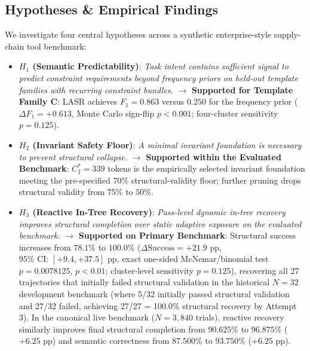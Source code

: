 \subsection{Hypotheses \& Empirical Findings}
We investigate four central hypotheses across a synthetic enterprise-style supply-chain tool benchmark:
\begin{itemize}
    \item \textbf{$H_1$ (Semantic Predictability)}: \textit{Task intent contains sufficient signal to predict constraint requirements beyond frequency priors on held-out template families with recurring constraint bundles.} $\rightarrow$ \textbf{Supported for Template Family C}: LASR achieves $F_1 = 0.863$ versus $0.250$ for the frequency prior ($\Delta F_1 = +0.613$, Monte Carlo sign-flip $p < 0.001$; four-cluster sensitivity $p = 0.125$).
    \item \textbf{$H_2$ (Invariant Safety Floor)}: \textit{A minimal invariant foundation is necessary to prevent structural collapse.} $\rightarrow$ \textbf{Supported within the Evaluated Benchmark}: $C_I^* = 339$ tokens is the empirically selected invariant foundation meeting the pre-specified 70\% structural-validity floor; further pruning drops structural validity from $75\%$ to $50\%$.
    \item \textbf{$H_3$ (Reactive In-Tree Recovery)}: \textit{Pass-level dynamic in-tree recovery improves structural completion over static adaptive exposure on the evaluated benchmark.} $\rightarrow$ \textbf{Supported on Primary Benchmark}: Structural success increases from $78.1\%$ to $100.0\%$ ($\Delta\text{Success} = +21.9\text{ pp}$, $95\%\text{ CI: } [+9.4, +37.5]\text{ pp}$, exact one-sided McNemar/binomial test $p = 0.0078125$, $p < 0.01$; cluster-level sensitivity $p = 0.125$), recovering all 27 trajectories that initially failed structural validation in the historical $N=32$ development benchmark (where 5/32 initially passed structural validation and 27/32 failed, achieving 27/27 = 100.0\% structural recovery by Attempt 3). In the canonical live benchmark ($N=3,840$ trials), reactive recovery similarly improves final structural completion from $90.625\%$ to $96.875\%$ ($+6.25\text{ pp}$) and semantic correctness from $87.500\%$ to $93.750\%$ ($+6.25\text{ pp}$).

\end{itemize}
